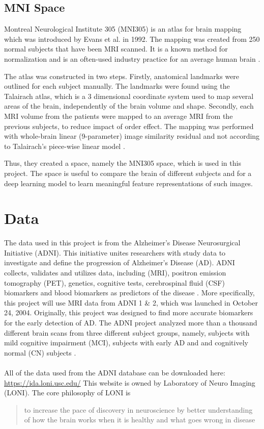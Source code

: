 \documentclass[11pt, fleqn, titlepage]{article}
\newcommand{\1}[1]{\mathds{1}\left[#1\right]}
\begin{document}
\subsection{MNI Space}
Montreal Neurological Institute 305 (MNI305) is an atlas for brain mapping which was introduced by Evans et al. in 1992. The mapping was created from 250 normal subjects that have been MRI scanned. It is a known method for normalization and is an often-used industry practice for an average human brain \cite{evans}. 

The atlas was constructed in two steps. Firstly, anatomical landmarks were outlined for each subject manually. The landmarks were found using the Talairach atlas, which is a 3 dimensional coordinate system used to map several areas of the brain, independently of the brain volume and shape. Secondly, each MRI volume from the patients were mapped to an average MRI from the previous subjects, to reduce impact of order effect. %
The mapping was performed with whole-brain linear (9-parameter) image similarity residual and not according to Talairach's piece-wise linear model \cite{collins}. 

Thus, they created a space, namely the MNI305 space, which is used in this project. The space is useful to compare the brain of different subjects and for a deep learning model to learn meaningful feature representations of such images. 


\section{Data} 


The data used in this project is from the Alzheimer's Disease Neurosurgical Initiative (ADNI). This initiative unites researchers with study data to investigate and define the progression of Alzheimer's Disease (AD). 
ADNI collects, validates and utilizes data, including (MRI), positron emission tomography (PET), genetics, cognitive tests, cerebrospinal fluid (CSF) biomarkers and blood biomarkers as predictors of the disease \cite{adni}.
More specifically, this project will use MRI data from ADNI 1 \& 2, which was launched in October 24, 2004. Originally, this project was designed to find more accurate biomarkers for the early detection of AD.
The ADNI project analyzed more than a thousand different brain scans from three different subject groups, namely, subjects with mild cognitive impairment (MCI), subjects with early AD and and cognitively normal (CN) subjects \cite{adni1}. 
\\\\
All of the data used from the ADNI database can be downloaded here: \url{https://ida.loni.usc.edu/} \newline
This website is owned by Laboratory of Neuro Imaging (LONI). The core philosophy of LONI is \blockcquote{loni}{to increase the pace of discovery in neuroscience by better understanding of how the brain works when it is healthy and what goes wrong in disease}.
\end{document}

